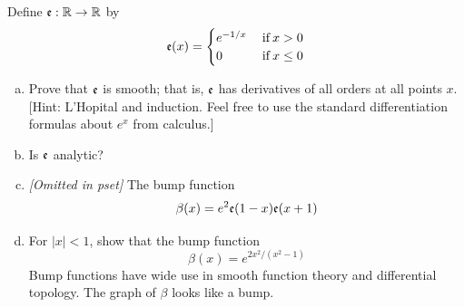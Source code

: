 \documentclass[a4paper, 12pt]{article}
\begin{document}
\begin{problem} [3.17]
Define $\mathfrak{e}: \mathbb{R} \to \mathbb{R}$ by \[
    \mathfrak{e}(x) = \begin{cases}
        e^{-1/x} & \:\text{if}\: x > 0    \\
        0        & \:\text{if}\: x \leq 0
    \end{cases}
\]
\begin{enumerate} [(a)]
    \item Prove that $\mathfrak{e}$ is smooth; that is, $\mathfrak{e}$ has derivatives of all orders at all points $x$. [Hint: L'Hopital and induction. Feel free to use the standard differentiation formulas about $e^x$ from calculus.]
    \item Is $\mathfrak{e}$ analytic?
    \item \textit{[Omitted in pset]} The bump function \[
              \beta(x) = e^2\mathfrak{e}(1-x)\mathfrak{e}(x+1)
          \]
    \item For $|x| < 1$, show that the bump function \[
              \beta(x) = e^{2x^2/(x^2-1)}
          \]
          Bump functions have wide use in smooth function theory and differential topology. The graph of $\beta$ looks like a bump.
\end{enumerate}
\end{problem}
\end{document}
